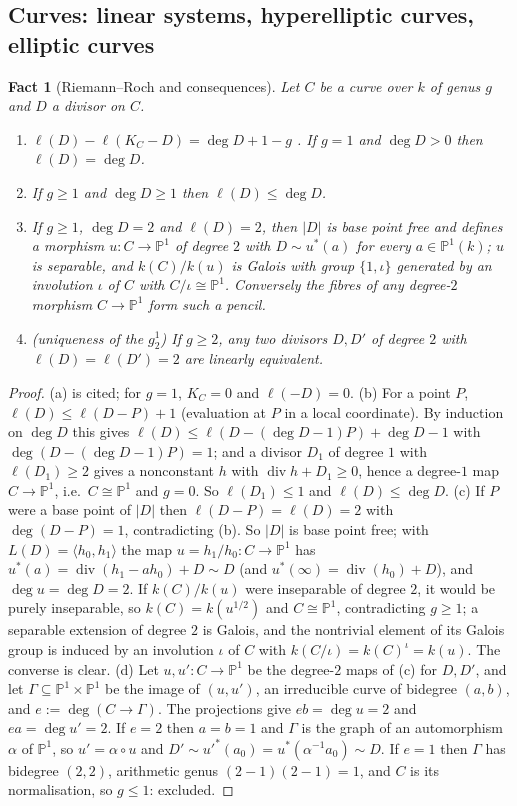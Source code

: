 \documentclass[11pt]{amsart}
\newtheorem{fact}[theorem]{Fact}
\theoremstyle{definition}
\theoremstyle{remark}
\newcommand{\PP}{\mathbb P}
\newcommand{\divv}{\operatorname{div}}
\begin{document}
\subsection{Curves: linear systems, hyperelliptic curves, elliptic curves}

\begin{fact}[Riemann--Roch and consequences]\label{fact:rr}
Let $C$ be a curve over $k$ of genus $g$ and $D$ a divisor on $C$.
\begin{enumerate}[label=\textup{(\alph*)}]
\item $\ell(D)-\ell(K_C-D)=\deg D+1-g$ \cite[IV.1.3]{Ha}. If $g=1$ and $\deg D>0$
then $\ell(D)=\deg D$.
\item If $g\ge1$ and $\deg D\ge1$ then $\ell(D)\le\deg D$.
\item If $g\ge1$, $\deg D=2$ and $\ell(D)=2$, then $|D|$ is base point free and defines a
morphism $u\colon C\to\PP^1$ of degree $2$ with $D\sim u^*(a)$ for every $a\in\PP^1(k)$;
$u$ is separable, and $k(C)/k(u)$ is Galois with group $\{1,\iota\}$ generated by an
involution $\iota$ of $C$ with $C/\iota\cong\PP^1$. Conversely the fibres of any
degree-$2$ morphism $C\to\PP^1$ form such a pencil.
\item (uniqueness of the $g^1_2$) If $g\ge2$, any two divisors $D,D'$ of degree $2$ with
$\ell(D)=\ell(D')=2$ are linearly equivalent.
\end{enumerate}
\end{fact}

\begin{proof}
(a) is cited; for $g=1$, $K_C=0$ and $\ell(-D)=0$. (b) For a point $P$,
$\ell(D)\le\ell(D-P)+1$ (evaluation at $P$ in a local coordinate). By induction on
$\deg D$ this gives $\ell(D)\le\ell(D-(\deg D-1)P)+\deg D-1$ with $\deg(D-(\deg D-1)P)=1$;
and a divisor $D_1$ of degree $1$ with $\ell(D_1)\ge2$ gives a nonconstant $h$ with
$\divv h+D_1\ge0$, hence a degree-$1$ map $C\to\PP^1$, i.e.\ $C\cong\PP^1$ and $g=0$. So
$\ell(D_1)\le1$ and $\ell(D)\le\deg D$. (c) If $P$ were a base point of $|D|$ then
$\ell(D-P)=\ell(D)=2$ with $\deg(D-P)=1$, contradicting (b). So $|D|$ is base point
free; with $L(D)=\langle h_0,h_1\rangle$ the map $u=h_1/h_0\colon C\to\PP^1$ has
$u^*(a)=\divv(h_1-ah_0)+D\sim D$ (and $u^*(\infty)=\divv(h_0)+D$), and $\deg u=\deg D=2$.
If $k(C)/k(u)$ were inseparable of degree $2$, it would be purely inseparable, so
$k(C)=k(u^{1/2})$ and $C\cong\PP^1$, contradicting $g\ge1$; a separable extension of
degree $2$ is Galois, and the nontrivial element of its Galois group is induced by an
involution $\iota$ of $C$ with $k(C/\iota)=k(C)^\iota=k(u)$. The converse is clear.
(d) Let $u,u'\colon C\to\PP^1$ be the degree-$2$ maps of (c) for $D,D'$, and let
$\Gamma\subseteq\PP^1\times\PP^1$ be the image of $(u,u')$, an irreducible curve of
bidegree $(a,b)$, and $e:=\deg(C\to\Gamma)$. The projections give $eb=\deg u=2$ and
$ea=\deg u'=2$. If $e=2$ then $a=b=1$ and $\Gamma$ is the graph of an automorphism
$\alpha$ of $\PP^1$, so $u'=\alpha\circ u$ and $D'\sim u'^*(a_0)=u^*(\alpha^{-1}a_0)\sim D$.
If $e=1$ then $\Gamma$ has bidegree $(2,2)$, arithmetic genus $(2-1)(2-1)=1$, and $C$ is
its normalisation, so $g\le1$: excluded.
\end{proof}
\end{document}
